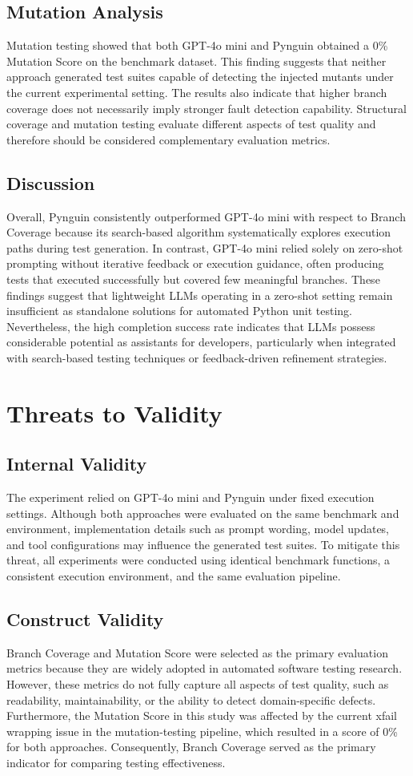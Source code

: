 \documentclass[conference]{IEEEtran}
\begin{document}
\subsection{Mutation Analysis}
Mutation testing showed that both GPT-4o mini and Pynguin obtained a 0\% Mutation Score on the benchmark dataset. This finding suggests that neither approach generated test suites capable of detecting the injected mutants under the current experimental setting.
The results also indicate that higher branch coverage does not necessarily imply stronger fault detection capability. Structural coverage and mutation testing evaluate different aspects of test quality and therefore should be considered complementary evaluation metrics.
\subsection{Discussion}
Overall, Pynguin consistently outperformed GPT-4o mini with respect to Branch Coverage because its search-based algorithm systematically explores execution paths during test generation. In contrast, GPT-4o mini relied solely on zero-shot prompting without iterative feedback or execution guidance, often producing tests that executed successfully but covered few meaningful branches.
These findings suggest that lightweight LLMs operating in a zero-shot setting remain insufficient as standalone solutions for automated Python unit testing. Nevertheless, the high completion success rate indicates that LLMs possess considerable potential as assistants for developers, particularly when integrated with search-based testing techniques or feedback-driven refinement strategies.
\section{Threats to Validity}
\subsection{Internal Validity}
   The experiment relied on GPT-4o mini and Pynguin under fixed execution settings. Although both approaches were evaluated on the same benchmark and environment, implementation details such as prompt wording, model updates, and tool configurations may influence the generated test suites. To mitigate this threat, all experiments were conducted using identical benchmark functions, a consistent execution environment, and the same evaluation pipeline.
\subsection{Construct Validity}
   Branch Coverage and Mutation Score were selected as the primary evaluation metrics because they are widely adopted in automated software testing research. However, these metrics do not fully capture all aspects of test quality, such as readability, maintainability, or the ability to detect domain-specific defects. Furthermore, the Mutation Score in this study was affected by the current xfail wrapping issue in the mutation-testing pipeline, which resulted in a score of 0\% for both approaches. Consequently, Branch Coverage served as the primary indicator for comparing testing effectiveness.
\end{document}
